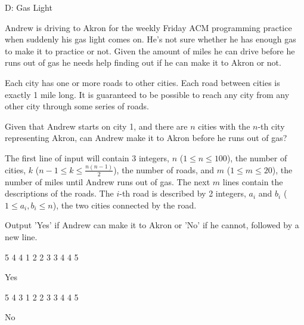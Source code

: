 \begin{problem}{D: Gas Light} 

Andrew is driving to Akron for the weekly Friday ACM programming practice when suddenly his gas light comes on. He's not sure whether he has enough gas to make it to practice or not. Given the amount of miles he can drive before he runs out of gas he needs help finding out if he can make it to Akron or not. 

Each city has one or more roads to other cities. Each road between cities is exactly 1 mile long. It is guaranteed to be possible to reach any city from any other city through some series of roads.

Given that Andrew starts on city 1, and there are $n$ cities with the $n$-th city representing Akron, can Andrew make it to Akron before he runs out of gas?

\begin{formalin}
The first line of input will contain 3 integers, $n$ ($1 \leq n \leq 100$), the number of cities, $k$ ($n - 1 \leq k \leq \frac {n(n-1)}{2}$), the number of roads, and $m$ ($1 \leq m \leq 20$), the number of miles until Andrew runs out of gas.
The next $m$ lines contain the descriptions of the roads. The $i$-th road is described by 2 integers, $a_i$ and $b_i$ ($1 \leq a_i, b_i \leq n$), the two cities connected by the road.
\end{formalin}

\begin{formalout}
Output 'Yes' if Andrew can make it to Akron or 'No' if he cannot, followed by a new line.
\end{formalout}

\begin{datain}
5 4 4
1 2
2 3
3 4
4 5
\end{datain}
\begin{dataout}
Yes
\end{dataout}

\begin{datain}
5 4 3
1 2
2 3
3 4
4 5
\end{datain}
\begin{dataout}
No
\end{dataout}

\end{problem}